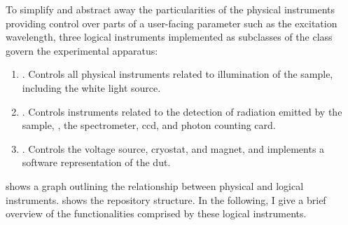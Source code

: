 To simplify and abstract away the particularities of the physical instruments providing control over parts of a user-facing parameter such as the excitation wavelength,
three logical instruments implemented as subclasses of the \qcodes {} class govern the experimental apparatus:
\begin{enumerate}\label{enm:logical_instruments}
    \item \label{itm:logical_instruments:exc}
        .
        Controls all physical instruments related to illumination of the sample, including the white light source.
    \item \label{itm:logical_instruments:det}
        .
        Controls instruments related to the detection of radiation emitted by the sample, \ie, the spectrometer, \acrshort{ccd}, and photon counting card.
    \item \label{itm:logical_instruments:sam}
        .
        Controls the \qdac voltage source, cryostat, and magnet, and implements a software representation of the \gls{dut}.
\end{enumerate}
 shows a graph outlining the relationship between physical and logical instruments.
 shows the repository structure.
In the following, I give a brief overview of the functionalities comprised by these logical instruments.

\clearpage
